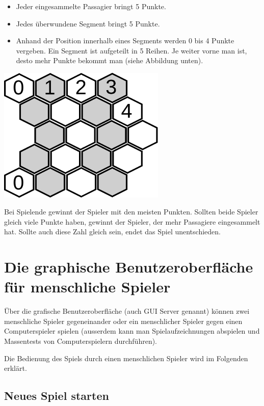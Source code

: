 \documentclass[12pt,a4paper, ngerman, oneside]{scrartcl}
\begin{document}
\begin{itemize}
  \item Jeder eingesammelte Passagier bringt 5 Punkte.
  \item Jedes überwundene Segment bringt 5 Punkte.
  \item Anhand der Position innerhalb eines Segments werden 0 bis 4 Punkte
    vergeben. Ein Segment ist aufgeteilt in 5 Reihen. Je weiter vorne man ist,
    desto mehr Punkte bekommt man (siehe Abbildung unten).
\end{itemize}

\begin{centering}
  \includegraphics[width=0.6\textwidth]{bilder/segment-punkte.pdf}
\end{centering}

Bei Spielende gewinnt der Spieler mit den meisten Punkten. Sollten beide Spieler
gleich viele Punkte haben, gewinnt der Spieler, der mehr Passagiere eingesammelt
hat. Sollte auch diese Zahl gleich sein, endet das Spiel unentschieden.

\section{Die graphische Benutzeroberfläche für menschliche Spieler}

Über die grafische Benutzeroberfläche (auch GUI Server genannt) können zwei
menschliche Spieler gegeneinander oder ein menschlicher Spieler gegen einen
Computerspieler spielen (ausserdem kann man Spielaufzeichnungen abspielen und
Massentests von Computerspielern durchführen).

Die Bedienung des Spiels durch einen menschlichen Spieler wird im Folgenden
erklärt.

\subsection{Neues Spiel starten}
\end{document}
